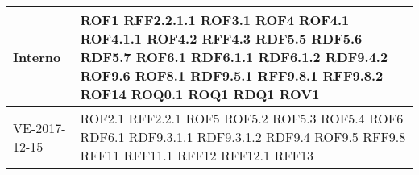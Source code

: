 \documentclass[../AnalisideiRequisiti.tex]{subfiles}
\begin{document}
\begin{longtable}{| p{4cm} | p{4cm} |}
		\newline Interno & \newline ROF1 \newline RFF2.2.1.1 \newline ROF3.1 \newline ROF4 \newline ROF4.1  \newline ROF4.1.1  \newline ROF4.2  \newline RFF4.3 \newline RDF5.5  \newline RDF5.6  \newline RDF5.7 \newline ROF6.1 \newline RDF6.1.1 \newline RDF6.1.2 \newline RDF9.4.2 \newline ROF9.6  \newline ROF8.1  \newline RDF9.5.1  \newline RFF9.8.1  \newline RFF9.8.2 \newline ROF14 \newline ROQ0.1 \newline ROQ1 \newline RDQ1  \newline ROV1 \\[1em]
	\hline
		\newline  VE-2017-12-15 & \newline ROF2.1 \newline RFF2.2.1 \newline ROF5 \newline ROF5.2 \newline ROF5.3 \newline ROF5.4 \newline ROF6 \newline RDF6.1 \newline RDF9.3.1.1 \newline RDF9.3.1.2 \newline RDF9.4 \newline ROF9.5 \newline RFF9.8 \newline RFF11 \newline RFF11.1 \newline RFF12 \newline RFF12.1 \newline RFF13 \\[1em]

\end{longtable}
\end{document}
